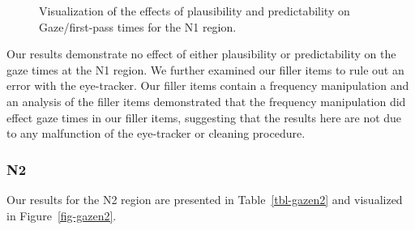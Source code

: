 \documentclass[
  letterpaper,
  DIV=11,
  numbers=noendperiod,
  nottoc]{scrreprt}
\begin{document}
\begin{figure}[htbp]


\caption{\label{fig-gazen1}Visualization of the effects of plausibility
and predictability on Gaze/first-pass times for the N1 region.}

\end{figure}%

Our results demonstrate no effect of either plausibility or
predictability on the gaze times at the N1 region. We further examined
our filler items to rule out an error with the eye-tracker. Our filler
items contain a frequency manipulation and an analysis of the filler
items demonstrated that the frequency manipulation did effect gaze times
in our filler items, suggesting that the results here are not due to any
malfunction of the eye-tracker or cleaning procedure.

\subsubsection{N2}\label{n2-1}

Our results for the N2 region are presented in Table~\ref{tbl-gazen2}
and visualized in Figure~\ref{fig-gazen2}.
\end{document}
